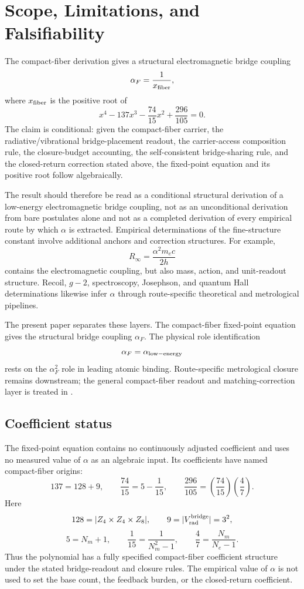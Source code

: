 \section{Scope, Limitations, and Falsifiability}

The compact-fiber derivation gives a structural electromagnetic bridge
coupling
\[
\alpha_F=\frac{1}{x_{\rm fiber}},
\]
where \(x_{\rm fiber}\) is the positive root of
\[
x^4
-
137x^3
-
\frac{74}{15}x^2
+
\frac{296}{105}
=
0.
\]
The claim is conditional: given the compact-fiber carrier, the
radiative/vibrational bridge-placement readout, the carrier-access
composition rule, the closure-budget accounting, the self-consistent
bridge-sharing rule, and the closed-return correction stated above, the
fixed-point equation and its positive root follow algebraically.

The result should therefore be read as a conditional structural
derivation of a low-energy electromagnetic bridge coupling, not as an
unconditional derivation from bare postulates alone and not as a completed
derivation of every empirical route by which \(\alpha\) is extracted.
Empirical determinations of the fine-structure constant involve
additional anchors and correction structures. For example,
\[
R_\infty=\frac{\alpha^2m_ec}{2h}
\]
contains the electromagnetic coupling, but also mass, action, and
unit-readout structure. Recoil, \(g-2\), spectroscopy, Josephson, and
quantum Hall determinations likewise infer \(\alpha\) through
route-specific theoretical and metrological pipelines.

The present paper separates these layers. The compact-fiber fixed-point
equation gives the structural bridge coupling \(\alpha_F\). The physical
role identification
\[
\alpha_F=\alpha_{\rm low-energy}
\]
rests on the \(\alpha_F^2\) role in leading atomic binding.
Route-specific metrological closure remains downstream; the general
compact-fiber readout and matching-correction layer is treated in
\cite{Wells2026FiniteReadout}.

\subsection{Coefficient status}

The fixed-point equation contains no continuously adjusted coefficient
and uses no measured value of \(\alpha\) as an algebraic input. Its
coefficients have named compact-fiber origins:
\[
137=128+9,
\qquad
\frac{74}{15}=5-\frac1{15},
\qquad
\frac{296}{105}=\left(\frac{74}{15}\right)\left(\frac47\right).
\]
Here
\[
128=|Z_4\times Z_4\times Z_8|,
\qquad
9=|V_{\rm rad}^{\rm bridge}|=3^2,
\]
\[
5=N_m+1,
\qquad
\frac1{15}=\frac1{N_m^2-1},
\qquad
\frac47=\frac{N_m}{N_e-1}.
\]
Thus the polynomial has a fully specified compact-fiber coefficient
structure under the stated bridge-readout and closure rules. The
empirical value of \(\alpha\) is not used to set the base count, the
feedback burden, or the closed-return coefficient.


